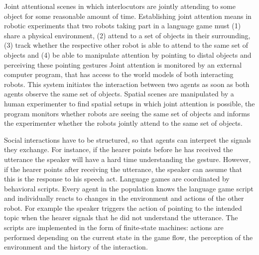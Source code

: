 Joint attentional scenes \citep{tomasello1995joint} in which interlocutors 
are jointly attending to some object for some reasonable amount of time.
Establishing joint attention means in robotic experiments that two robots 
taking part in a language game must (1) share a physical environment, 
(2) attend to a set of objects in their surrounding, (3) track whether the 
respective other robot is able to attend to the same set of objects and 
(4) be able to manipulate attention by pointing to distal objects and perceiving
these pointing gestures  Joint attention is monitored by an external computer 
program, that has access to the world models of both interacting robots.  This system
initiates the interaction between two agents as soon as both agents
observe the same set of objects.  Spatial scenes are manipulated 
by a human experimenter to find spatial setups in which joint attention is
possible, the program monitors whether robots are seeing the same
set of objects and informs the experimenter whether the robots jointly attend 
to the same set of objects.

Social interactions have to be structured, so that agents can interpret the 
signals they exchange. For instance, if the hearer points before
he has received the utterance the speaker will have a hard time 
understanding the gesture. However, if the hearer points after
receiving the utterance, the speaker can assume that this is the response
to his speech act. Language games are coordinated by behavioral scripts. 
Every agent in the population knows the language game script and individually reacts
to changes in the environment and actions of the other robot. For
example the speaker triggers the action of pointing to the intended
topic when the hearer signals that he did not understand the
utterance. The scripts are implemented in the form of finite-state
machines: actions are performed depending on the current state in the
game flow, the perception of the environment and the history of the
interaction.

